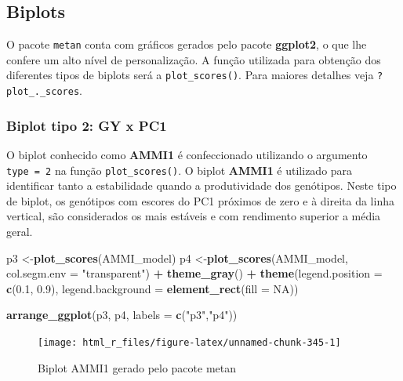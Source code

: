 \documentclass[
]{book}
\newenvironment{Shaded}{\begin{snugshade}}{\end{snugshade}}
\newcommand{\DataTypeTok}[1]{\textcolor[rgb]{0.13,0.29,0.53}{#1}}
\newcommand{\FloatTok}[1]{\textcolor[rgb]{0.00,0.00,0.81}{#1}}
\newcommand{\KeywordTok}[1]{\textcolor[rgb]{0.13,0.29,0.53}{\textbf{#1}}}
\newcommand{\NormalTok}[1]{#1}
\newcommand{\OperatorTok}[1]{\textcolor[rgb]{0.81,0.36,0.00}{\textbf{#1}}}
\newcommand{\OtherTok}[1]{\textcolor[rgb]{0.56,0.35,0.01}{#1}}
\newcommand{\StringTok}[1]{\textcolor[rgb]{0.31,0.60,0.02}{#1}}
\begin{document}
\hypertarget{biplots}{%
\subsection{Biplots}\label{biplots}}

O pacote \texttt{metan} conta com gráficos gerados pelo pacote \textbf{ggplot2}, o que lhe confere um alto nível de personalização. A função utilizada para obtenção dos diferentes tipos de biplots será a \texttt{plot\_scores()}. Para maiores detalhes veja \texttt{?plot\_.\_scores}.

\hypertarget{biplot-tipo-2-gy-x-pc1}{%
\subsubsection{Biplot tipo 2: GY x PC1}\label{biplot-tipo-2-gy-x-pc1}}

O biplot conhecido como \textbf{AMMI1} é confeccionado utilizando o argumento \texttt{type\ =\ 2} na função \texttt{plot\_scores()}. O biplot \textbf{AMMI1} é utilizado para identificar tanto a estabilidade quando a produtividade dos genótipos. Neste tipo de biplot, os genótipos com escores do PC1 próximos de zero e à direita da linha vertical, são considerados os mais estáveis e com rendimento superior a média geral.

\begin{Shaded}
\begin{Highlighting}[]
\NormalTok{p3 <-}\KeywordTok{plot_scores}\NormalTok{(AMMI_model)}
\NormalTok{p4 <-}\KeywordTok{plot_scores}\NormalTok{(AMMI_model,}
                 \DataTypeTok{col.segm.env =} \StringTok{"transparent"}\NormalTok{) }\OperatorTok{+}
\StringTok{                 }\KeywordTok{theme_gray}\NormalTok{() }\OperatorTok{+}
\StringTok{                 }\KeywordTok{theme}\NormalTok{(}\DataTypeTok{legend.position =} \KeywordTok{c}\NormalTok{(}\FloatTok{0.1}\NormalTok{, }\FloatTok{0.9}\NormalTok{),}
                       \DataTypeTok{legend.background =} \KeywordTok{element_rect}\NormalTok{(}\DataTypeTok{fill =} \OtherTok{NA}\NormalTok{))}

\KeywordTok{arrange_ggplot}\NormalTok{(p3, p4, }\DataTypeTok{labels =} \KeywordTok{c}\NormalTok{(}\StringTok{"p3"}\NormalTok{,}\StringTok{"p4"}\NormalTok{))}
\end{Highlighting}
\end{Shaded}

\begin{figure}

{\centering \texttt{[image: html\_r\_files/figure-latex/unnamed-chunk-345-1]} 

}

\caption{Biplot AMMI1 gerado pelo pacote metan}\label{fig:unnamed-chunk-345}
\end{figure}
\end{document}
